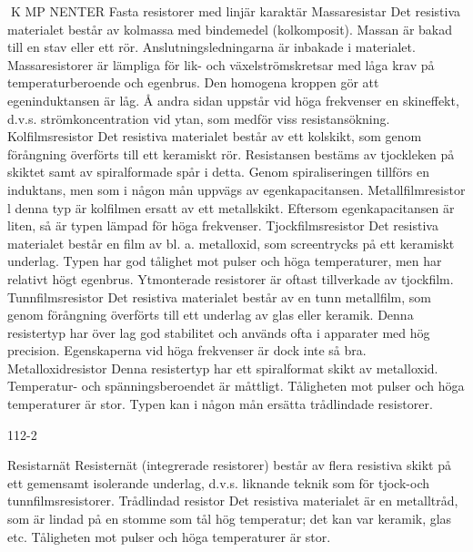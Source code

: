 K MP NENTER
Fasta resistorer med linjär karaktär
Massaresistar
Det resistiva materialet består av kolmassa
med bindemedel (kolkomposit). Massan är
bakad till en stav eller ett rör. Anslutningsledningarna är inbakade i materialet.
Massaresistorer är lämpliga för lik- och
växelströmskretsar med låga krav på temperaturberoende och egenbrus. Den homogena kroppen gör att egeninduktansen är
låg. Å andra sidan uppstår vid höga frekvenser en skineffekt, d.v.s. strömkoncentration
vid ytan, som medför viss resistansökning.
Kolfilmsresistor
Det resistiva materialet består av ett kolskikt,
som genom förångning överförts till ett keramiskt rör. Resistansen bestäms av tjockleken på skiktet samt av spiralformade spår i
detta. Genom spiraliseringen tillförs en induktans, men som i någon mån uppvägs av
egenkapacitansen.
Metallfilmresistor
l denna typ är kolfilmen ersatt av ett metallskikt. Eftersom egenkapacitansen är liten,
så är typen lämpad för höga frekvenser.
Tjockfilmsresistor
Det resistiva materialet består en film av bl. a.
metalloxid, som screentrycks på ett keramiskt underlag. Typen har god tålighet mot
pulser och höga temperaturer, men har relativt högt egenbrus. Ytmonterade resistorer
är oftast tillverkade av tjockfilm.
Tunnfilmsresistor
Det resistiva materialet består av en tunn
metallfilm, som genom förångning överförts
till ett underlag av glas eller keramik.
Denna resistertyp har över lag god stabilitet och används ofta i apparater med hög
precision. Egenskaperna vid höga frekvenser är dock inte så bra.
Metalloxidresistor
Denna resistertyp har ett spiralformat skikt
av metalloxid. Temperatur- och spänningsberoendet är måttligt. Tåligheten mot pulser
och höga temperaturer är stor. Typen kan i
någon mån ersätta trådlindade resistorer.

112-2

Resistarnät
Resisternät (integrerade resistorer) består
av flera resistiva skikt på ett gemensamt
isolerande underlag, d.v.s. liknande teknik
som för tjock-och tunnfilmsresistorer.
Trådlindad resistor
Det resistiva materialet är en metalltråd,
som är lindad på en stomme som tål hög
temperatur; det kan var keramik, glas etc.
Tåligheten mot pulser och höga temperaturer är stor.

